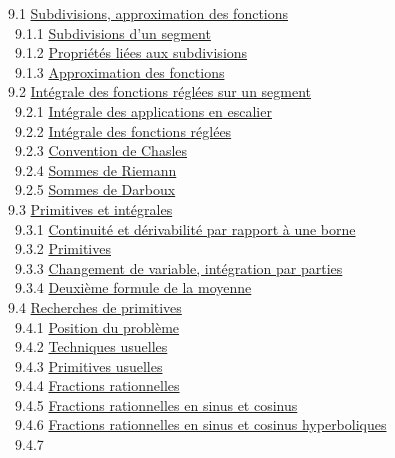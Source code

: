 \documentclass[]{article}
\begin{document}
~9.1 \href{coursse50.html\#x62-2640009.1}{Subdivisions, approximation
des fonctions} \\ ~~9.1.1
\href{coursse50.html\#x62-2650009.1.1}{Subdivisions d'un segment} \\
~~9.1.2 \href{coursse50.html\#x62-2660009.1.2}{Propriétés liées aux
subdivisions} \\ ~~9.1.3
\href{coursse50.html\#x62-2670009.1.3}{Approximation des fonctions} \\
~9.2 \href{coursse51.html\#x63-2680009.2}{Intégrale des fonctions
réglées sur un segment} \\ ~~9.2.1
\href{coursse51.html\#x63-2690009.2.1}{Intégrale des applications en
escalier} \\ ~~9.2.2 \href{coursse51.html\#x63-2700009.2.2}{Intégrale
des fonctions réglées} \\ ~~9.2.3
\href{coursse51.html\#x63-2710009.2.3}{Convention de Chasles} \\ ~~9.2.4
\href{coursse51.html\#x63-2720009.2.4}{Sommes de Riemann} \\ ~~9.2.5
\href{coursse51.html\#x63-2730009.2.5}{Sommes de Darboux} \\ ~9.3
\href{coursse52.html\#x64-2740009.3}{Primitives et intégrales} \\
~~9.3.1 \href{coursse52.html\#x64-2750009.3.1}{Continuité et
dérivabilité par rapport à une borne} \\ ~~9.3.2
\href{coursse52.html\#x64-2760009.3.2}{Primitives} \\ ~~9.3.3
\href{coursse52.html\#x64-2770009.3.3}{Changement de variable,
intégration par parties} \\ ~~9.3.4
\href{coursse52.html\#x64-2780009.3.4}{Deuxième formule de la moyenne}
\\ ~9.4 \href{coursse53.html\#x65-2790009.4}{Recherches de primitives}
\\ ~~9.4.1 \href{coursse53.html\#x65-2800009.4.1}{Position du problème}
\\ ~~9.4.2 \href{coursse53.html\#x65-2810009.4.2}{Techniques usuelles}
\\ ~~9.4.3 \href{coursse53.html\#x65-2820009.4.3}{Primitives usuelles}
\\ ~~9.4.4 \href{coursse53.html\#x65-2830009.4.4}{Fractions
rationnelles} \\ ~~9.4.5
\href{coursse53.html\#x65-2840009.4.5}{Fractions rationnelles en sinus
et cosinus} \\ ~~9.4.6 \href{coursse53.html\#x65-2850009.4.6}{Fractions
rationnelles en sinus et cosinus hyperboliques} \\ ~~9.4.7
\end{document}
